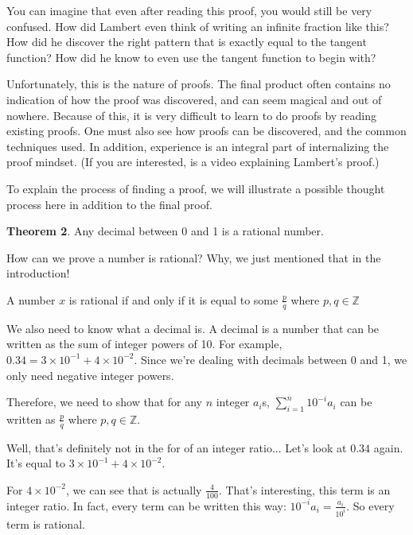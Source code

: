 \documentclass[11pt]{article}
\begin{document}
    You can imagine that even after reading this proof, you would still be very confused.
    How did Lambert even think of writing an infinite fraction like this? How did he
    discover the right pattern that is exactly equal to the tangent function? How did
    he know to even use the tangent function to begin with?
    
    Unfortunately, this is the nature of proofs. The final product often contains no
    indication of how the proof was discovered, and can seem magical and out of nowhere.
    Because of this, it is very difficult to learn to do proofs by reading existing proofs.
    One must also see how proofs can be discovered, and the common techniques used.
    In addition, experience is an integral part of internalizing the proof mindset.
    (If you are interested, \href{https://youtu.be/Lk_QF_hcM8A}{\color{blue}{here}} is a video explaining Lambert's proof.)
    

    To explain the process of finding a proof, we will illustrate a possible thought
    process here in addition to the final proof.
    
    \textbf{Theorem 2}. Any decimal between 0 and 1 is a rational number.
    
    How can we prove a number is rational? Why, we just mentioned that in the introduction!
    
    A number $x$ is rational if and only if it is equal to some $\frac pq$ where $p,q\in\mathbb Z$
    
    We also need to know what a decimal is. A decimal is a number that can be written as
    the sum of integer powers of 10. For example, $0.34=3\times10^{-1}+4\times10^{-2}$.
    Since we're dealing with decimals between 0 and 1, we only need negative integer powers.
    
    Therefore, we need to show that for any $n$ integer $a_i$s,
    $\displaystyle\sum_{i=1}^{n}10^{-i}a_i$ can be written as $\frac pq$ where
    $p,q\in\mathbb Z$.
    
    Well, that's definitely not in the for of an integer ratio... Let's look at $0.34$ again. It's equal to $3\times10^{-1}+4\times10^{-2}$.
    
    For $4\times10^{-2}$, we can see that is actually $\frac4{100}$. That's
    interesting, this term is an integer ratio. In fact, every term can be written this way:
    $10^{-i}a_i=\frac{a_i}{10^i}$. So every term is rational.
    
\end{document}
